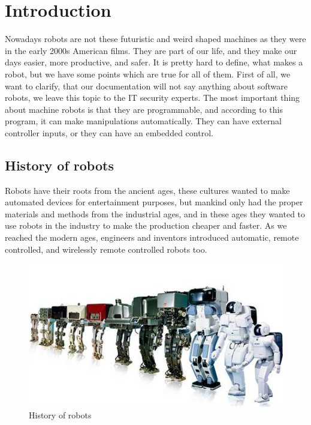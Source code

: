 \newpage

\thispagestyle{empty}

\chapter{Introduction}

	\hspace{15pt}Nowadays robots are not these futuristic and weird shaped machines as they were in the early 2000s American films. They are part of our life, and they make our days easier, more productive, and safer. It is pretty hard to define, what makes a robot, but we have some points which are true for all of them. First of all, we want to clarify, that our documentation will not say anything about software robots, we leave this topic to the IT security experts. The most important thing about machine robots is that they are programmable, and according to this program, it can make manipulations automatically. They can have external controller inputs, or they can have an embedded control. \cite{robotics2}






	\section{History of robots}

		\hspace{15pt}Robots have their roots from the ancient ages, these cultures wanted to make automated devices for entertainment purposes, but mankind only had the proper materials and methods from the industrial ages, and in these ages they wanted to use robots in the industry to make the production cheaper and faster. As we reached the modern ages, engineers and inventors introduced automatic, remote controlled, and wirelessly remote controlled robots too.	\cite{robotics1}
		
		\begin{figure}[H]
			\centering
			\includegraphics[width=\textwidth]{./images/history_of_robots}
			\caption{History of robots}
		\end{figure}


